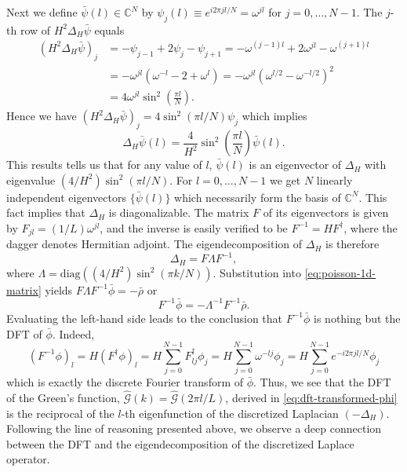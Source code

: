 Next we define $\bar{\psi}(l) \in \mathbb{C}^N$ by $\psi_j(l) \equiv e^{i2\pi jl/N} = \omega^{jl}$ for $j=0,\dots,N-1$.
The $j$-th row of $H^2\Delta_H \bar{\psi}$ equals
\begin{align*}
    (H^2\Delta_H \bar{\psi})_j
     & = -\psi_{j-1} + 2\psi_j - \psi_{j+1}
    = -\omega^{(j-1)l} + 2\omega^{jl} - \omega^{(j+1)l}     \\
     & = -\omega^{jl}(\omega^{-l} - 2 + \omega^l)
    = -\omega^{jl}(\omega^{l/2} - \omega^{-l/2})^2          \\
     & = 4\omega^{jl} \sin^2\left( \frac{\pi l}{N} \right).
\end{align*}
Hence we have $(H^2\Delta_H \bar{\psi})_j = 4\sin^2(\pi l/N) \psi_j$ which implies
\begin{equation*}
    \Delta_H \bar{\psi}(l)
    = \frac{4}{H^2} \sin^2\left( \frac{\pi l}{N} \right) \bar{\psi}(l).
\end{equation*}
This results tells us that for any value of $l$, $\bar{\psi}(l)$ is an eigenvector of $\Delta_H$ with eigenvalue $(4/H^2)\sin^2(\pi l/N)$.
For $l=0,\dots, N-1$ we get $N$ linearly independent eigenvectors $\{\bar{\psi}(l)\}$ which necessarily form the basis of $\mathbb{C}^N$.
This fact implies that $\Delta_H$ is diagonalizable.
The matrix $F$ of its eigenvectors is given by $F_{jl} = (1/L) \omega^{jl}$, and the inverse is easily verified to be $F^{-1} = H F^\dagger$, where the dagger denotes Hermitian adjoint.
The eigendecomposition of $\Delta_H$ is therefore
\begin{equation*}
    \Delta_H = F\Lambda F^{-1},
\end{equation*}
where $\Lambda = \text{diag}((4/H^2)\sin^2(\pi k/N))$.
Substitution into \autoref{eq:poisson-1d-matrix} yields $F\Lambda F^{-1} \bar{\phi} = -\bar{\rho}$ or
\begin{equation*}
    F^{-1}\bar{\phi} = -\Lambda^{-1}F^{-1}\bar{\rho}.
\end{equation*}
Evaluating the left-hand side leads to the conclusion that $F^{-1}\bar\phi$ is nothing but the DFT of $\bar\phi$.
Indeed,
\begin{equation*}
    (F^{-1}\phi)_l
    = H (F^\dagger \phi)_l
    = H \sum_{j=0}^{N-1}F^\dagger_{lj}\phi_j
    = H \sum_{j=0}^{N-1}\omega^{-lj}\phi_j
    = H \sum_{j=0}^{N-1}e^{-i2\pi jl / N}\phi_j
\end{equation*}
which is exactly the discrete Fourier transform of $\bar\phi$.
Thus, we see that the DFT of the Green's function, $\hat{\mathcal{G}}(k) = \hat{\mathcal{G}}(2\pi l / L)$, derived in \autoref{eq:dft-transformed-phi} is the reciprocal of the $l$-th eigenfunction of the discretized Laplacian $(-\Delta_H)$.
Following the line of reasoning presented above, we observe a deep connection between the DFT and the eigendecomposition of the discretized Laplace operator.

